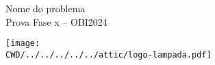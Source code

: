 
\noindent
\begin{minipage}{.15\textwidth}
\hspace*{1cm}
\end{minipage}%
\begin{minipage}[t]{.7\textwidth}
\begin{center}
  {\huge \sf Nome do problema}\\[3mm]
  {\large \sf Prova Fase x -- OBI2024}
\end{center}
\end{minipage}%
\begin{minipage}{.15\textwidth}
\begin{flushright}
  \texttt{[image: \\CWD/../../../../../attic/logo-lampada.pdf]}
\end{flushright} 
\end{minipage}
\vspace{3mm}

